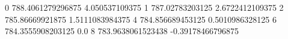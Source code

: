 0 788.4061279296875 4.050537109375
1 787.02783203125 2.6722412109375
2 785.86669921875 1.5111083984375
4 784.856689453125 0.5010986328125
6 784.3555908203125 0.0
8 783.9638061523438 -0.39178466796875
